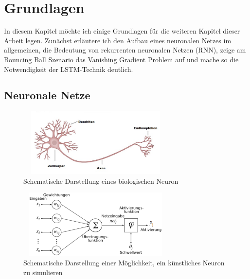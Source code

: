 \chapter{Grundlagen} 
\label{ch:grundlagen}
In diesem Kapitel möchte ich einige Grundlagen für die weiteren Kapitel dieser Arbeit legen. Zunächst erläutere ich den Aufbau eines neuronalen Netzes im allgemeinen, die Bedeutung von rekurrenten neuronalen Netzen (RNN), zeige am Bouncing Ball Szenario das Vanishing Gradient Problem auf und mache so die Notwendigkeit der LSTM-Technik deutlich.
\section{Neuronale Netze}

\begin{figure}
	\centering
	\includegraphics[width=0.7\textwidth, height=130px]{pics/neuron.jpg}	
	\caption{Schematische Darstellung eines biologischen Neuron \cite{bib:neuron}}
	\label{img:neuron}
\end{figure}
\begin{figure}
	\centering
	\includegraphics[width=0.7\textwidth, height=130px]{pics/aneuron.png}	
	\caption{Schematische Darstellung einer Möglichkeit, ein künstliches Neuron zu simulieren \cite{bib:aneuron}}
	\label{img:aneuron}
\end{figure}


